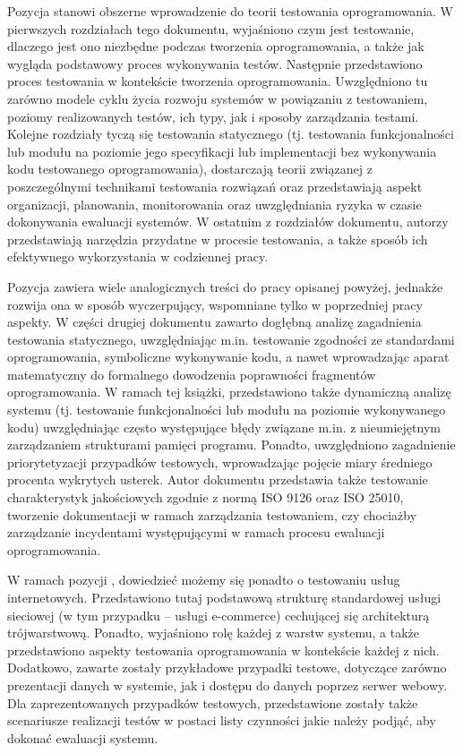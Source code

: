 Pozycja \cite{spillner2021software} stanowi obszerne wprowadzenie do teorii testowania oprogramowania. W pierwszych rozdziałach tego dokumentu, wyjaśniono czym jest testowanie, dlaczego jest ono niezbędne podczas tworzenia oprogramowania, a także jak wygląda podstawowy proces wykonywania testów. Następnie przedstawiono proces testowania w kontekście tworzenia oprogramowania. Uwzględniono tu zarówno modele cyklu życia rozwoju systemów w powiązaniu z testowaniem, poziomy realizowanych testów, ich typy, jak i sposoby zarządzania testami. Kolejne rozdziały tyczą się testowania statycznego (tj. testowania funkcjonalności lub modułu na poziomie jego specyfikacji lub implementacji bez wykonywania kodu testowanego oprogramowania), dostarczają teorii związanej z poszczególnymi technikami testowania rozwiązań oraz przedstawiają aspekt organizacji, planowania, monitorowania oraz uwzględniania ryzyka w czasie dokonywania ewaluacji systemów. W ostatnim z rozdziałów dokumentu, autorzy przedstawiają narzędzia przydatne w procesie testowania, a także sposób ich efektywnego wykorzystania w codziennej pracy.

Pozycja \cite{roman2015testowanie} zawiera wiele analogicznych treści do pracy opisanej powyżej, jednakże rozwija ona w sposób wyczerpujący, wspomniane tylko w poprzedniej pracy aspekty. W części drugiej dokumentu zawarto dogłębną analizę zagadnienia testowania statycznego, uwzględniając m.in. testowanie zgodności ze standardami oprogramowania, symboliczne wykonywanie kodu, a nawet wprowadzając aparat matematyczny do formalnego dowodzenia poprawności fragmentów oprogramowania. W ramach tej książki, przedstawiono także dynamiczną analizę systemu (tj. testowanie funkcjonalności lub modułu na poziomie wykonywanego kodu) uwzględniając często występujące błędy związane m.in. z nieumiejętnym zarządzaniem strukturami pamięci programu. Ponadto, uwzględniono zagadnienie priorytetyzacji przypadków testowych, wprowadzając pojęcie miary średniego procenta wykrytych usterek. Autor dokumentu przedstawia także testowanie charakterystyk jakościowych zgodnie z normą ISO 9126 oraz ISO 25010, tworzenie dokumentacji w ramach zarządzania testowaniem, czy chociażby zarządzanie incydentami występującymi w ramach procesu ewaluacji oprogramowania.

W ramach pozycji \cite{myers2011art}, dowiedzieć możemy się ponadto o testowaniu usług internetowych. Przedstawiono tutaj podstawową strukturę standardowej usługi sieciowej (w tym przypadku – usługi e-commerce) cechującej się architekturą trójwarstwową. Ponadto, wyjaśniono rolę każdej z warstw systemu, a także przedstawiono aspekty testowania oprogramowania w kontekście każdej z nich. Dodatkowo, zawarte zostały przykładowe przypadki testowe, dotyczące zarówno prezentacji danych w systemie, jak i dostępu do danych poprzez serwer webowy. Dla zaprezentowanych przypadków testowych, przedstawione zostały także scenariusze realizacji testów w postaci listy czynności jakie należy podjąć, aby dokonać ewaluacji systemu.


